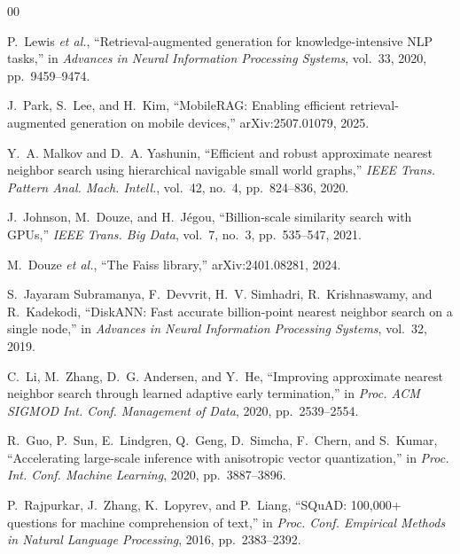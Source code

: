 \documentclass[conference]{IEEEtran}
\begin{document}
\begin{thebibliography}{00}

P.~Lewis \emph{et al.}, ``Retrieval-augmented generation for knowledge-intensive
NLP tasks,'' in \emph{Advances in Neural Information Processing Systems},
vol.~33, 2020, pp.~9459--9474.

J.~Park, S.~Lee, and H.~Kim, ``MobileRAG: Enabling efficient
retrieval-augmented generation on mobile devices,'' arXiv:2507.01079, 2025.

Y.~A. Malkov and D.~A. Yashunin, ``Efficient and robust approximate nearest
neighbor search using hierarchical navigable small world graphs,'' \emph{IEEE
Trans. Pattern Anal. Mach. Intell.}, vol.~42, no.~4, pp.~824--836, 2020.

J.~Johnson, M.~Douze, and H.~J\'egou, ``Billion-scale similarity search with
GPUs,'' \emph{IEEE Trans. Big Data}, vol.~7, no.~3, pp.~535--547, 2021.

M.~Douze \emph{et al.}, ``The Faiss library,'' arXiv:2401.08281, 2024.

S.~Jayaram Subramanya, F.~Devvrit, H.~V. Simhadri, R.~Krishnaswamy, and
R.~Kadekodi, ``DiskANN: Fast accurate billion-point nearest neighbor search on
a single node,'' in \emph{Advances in Neural Information Processing Systems},
vol.~32, 2019.

C.~Li, M.~Zhang, D.~G. Andersen, and Y.~He, ``Improving approximate nearest
neighbor search through learned adaptive early termination,'' in \emph{Proc.
ACM SIGMOD Int. Conf. Management of Data}, 2020, pp.~2539--2554.

R.~Guo, P.~Sun, E.~Lindgren, Q.~Geng, D.~Simcha, F.~Chern, and S.~Kumar,
``Accelerating large-scale inference with anisotropic vector quantization,'' in
\emph{Proc. Int. Conf. Machine Learning}, 2020, pp.~3887--3896.

P.~Rajpurkar, J.~Zhang, K.~Lopyrev, and P.~Liang, ``SQuAD: 100,000+ questions
for machine comprehension of text,'' in \emph{Proc. Conf. Empirical Methods in
Natural Language Processing}, 2016, pp.~2383--2392.


\end{thebibliography}
\end{document}
